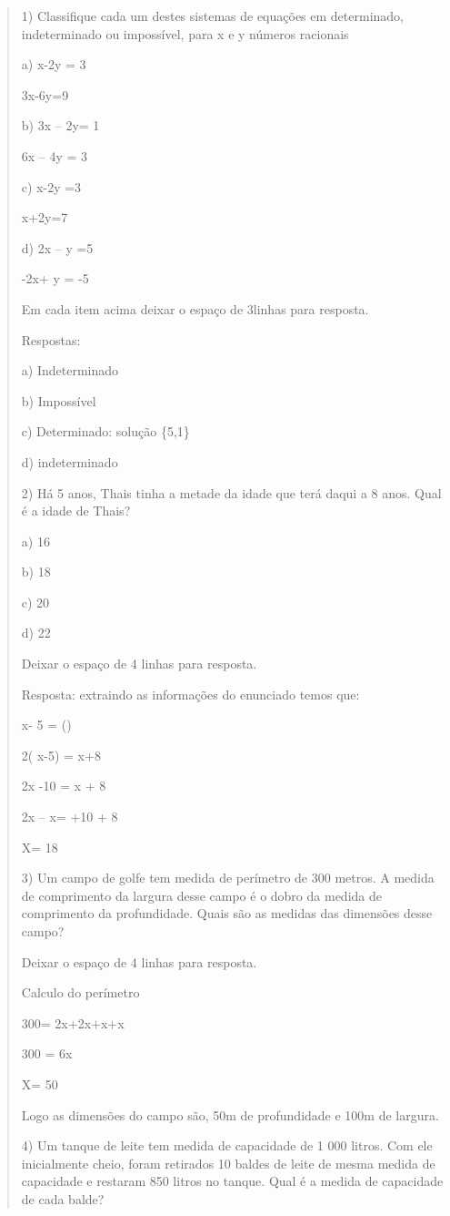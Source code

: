 \begin{quote}
\begin{escolha}
1) Classifique cada um destes sistemas de equações em determinado,
indeterminado ou impossível, para x e y números racionais

a) x-2y = 3

3x-6y=9

b) 3x -- 2y= 1

6x -- 4y = 3

c) x-2y =3

x+2y=7

d) 2x -- y =5

-2x+ y = -5

Em cada item acima deixar o espaço de 3linhas para resposta.

Respostas:

a) Indeterminado

b) Impossível

c) Determinado: solução \{5,1\}

d) indeterminado

2) Há 5 anos, Thais tinha a metade da idade que terá daqui a 8 anos.
Qual é a idade de Thais?

a) 16

b) 18

c) 20

d) 22

Deixar o espaço de 4 linhas para resposta.

Resposta: extraindo as informações do enunciado temos que:

x- 5 = ()

2( x-5) = x+8

2x -10 = x + 8

2x -- x= +10 + 8

X= 18

3) Um campo de golfe tem medida de perímetro de 300 metros. A medida de
comprimento da largura desse campo é o dobro da medida de comprimento da
profundidade. Quais são as medidas das dimensões desse campo?

Deixar o espaço de 4 linhas para resposta.

Calculo do perímetro

300= 2x+2x+x+x

300 = 6x

X= 50

Logo as dimensões do campo são, 50m de profundidade e 100m de largura.

4) Um tanque de leite tem medida de capacidade de 1 000 litros. Com ele
inicialmente cheio, foram retirados 10 baldes de leite de mesma medida
de capacidade e restaram 850 litros no tanque. Qual é a medida de
capacidade de cada balde?


\end{escolha}
\end{quote}
